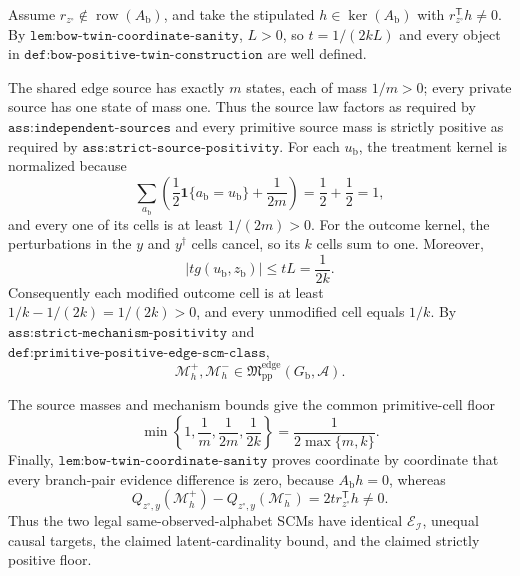 Assume \(r_{z^{\circ}}\notin\operatorname{row}(A_{\mathrm b})\), and take the stipulated \(h\in\ker(A_{\mathrm b})\) with \(r_{z^{\circ}}^{\mathsf T}h\neq0\).  By \(\texttt{lem:bow-twin-coordinate-sanity}\), \(L>0\), so \(t=1/(2kL)\) and every object in \(\texttt{def:bow-positive-twin-construction}\) are well defined.

The shared edge source has exactly \(m\) states, each of mass \(1/m>0\); every private source has one state of mass one.  Thus the source law factors as required by \(\texttt{ass:independent-sources}\) and every primitive source mass is strictly positive as required by \(\texttt{ass:strict-source-positivity}\).  For each \(u_{\mathrm b}\), the treatment kernel is normalized because
\[
\sum_{a_{\mathrm b}}\left(\frac12\mathbf 1\{a_{\mathrm b}=u_{\mathrm b}\}+\frac1{2m}\right)=\frac12+\frac12=1,
\]
and every one of its cells is at least \(1/(2m)>0\).  For the outcome kernel, the perturbations in the \(y\) and \(y^{\dagger}\) cells cancel, so its \(k\) cells sum to one.  Moreover,
\[
\lvert t g(u_{\mathrm b},z_{\mathrm b})\rvert\leq tL=\frac1{2k}.
\]
Consequently each modified outcome cell is at least \(1/k-1/(2k)=1/(2k)>0\), and every unmodified cell equals \(1/k\).  By \(\texttt{ass:strict-mechanism-positivity}\) and \(\texttt{def:primitive-positive-edge-scm-class}\),
\[
\mathcal M_h^+,\mathcal M_h^-\in
\mathfrak M_{\mathrm{pp}}^{\mathrm{edge}}(G_{\mathrm b},\mathcal A).
\]

The source masses and mechanism bounds give the common primitive-cell floor
\[
\min\left\{1,\frac1m,\frac1{2m},\frac1{2k}\right\}
=\frac1{2\max\{m,k\}}.
\]
Finally, \(\texttt{lem:bow-twin-coordinate-sanity}\) proves coordinate by coordinate that every branch-pair evidence difference is zero, because \(A_{\mathrm b}h=0\), whereas
\[
Q_{z^{\circ},y}(\mathcal M_h^+)-Q_{z^{\circ},y}(\mathcal M_h^-)
=2t r_{z^{\circ}}^{\mathsf T}h\neq0.
\]
Thus the two legal same-observed-alphabet SCMs have identical \(\mathcal E_{\mathcal I}\), unequal causal targets, the claimed latent-cardinality bound, and the claimed strictly positive floor.